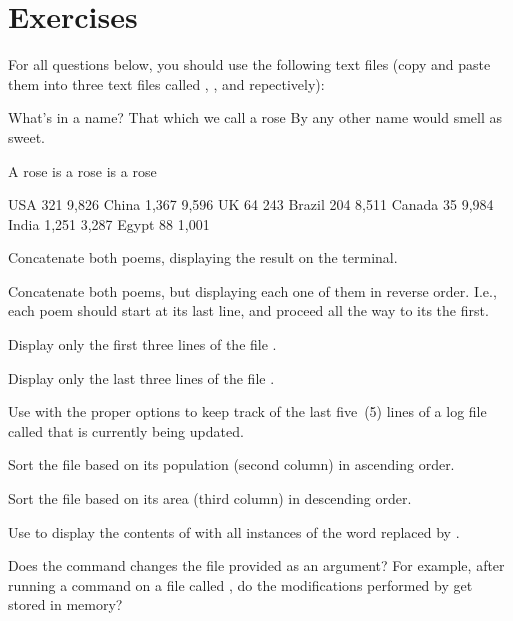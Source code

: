 \section*{Exercises}

For all questions below, you should use the following text files (copy and paste them into three text files called ,  , and  repectively):

\begin{command_line}[make]
What's in a name? That which we call a rose
By any other name would smell as sweet.
\end{command_line}

\begin{command_line}[Bash]
A rose is a rose is a rose
\end{command_line}

\begin{command_line}[Bash]
USA     321     9,826
China   1,367   9,596
UK      64      243
Brazil  204     8,511
Canada  35      9,984
India   1,251   3,287
Egypt   88      1,001
\end{command_line}

\begin{exercises}
  \item Concatenate both poems, displaying the result on the terminal.
  \item Concatenate both poems, but displaying each one of them in reverse order. I.e., each poem should start at its last line, and proceed all the way to its the first.
  \item Display only the first three lines of the file .
  \item Display only the last three lines of the file .
  \item Use  with the proper options to keep track of the last five~(5) lines of a log file called  that is currently being updated.
  \item Sort the  file based on its population (second column) in ascending order.
  \item Sort the  file based on its area (third column) in descending order.
  \item Use  to display the contents of  with all instances of the word  replaced by .
  \item Does the  command changes the file provided as an argument? For example, after running a  command on a file called , do the modifications performed by  get stored in memory?
\end{exercises}
